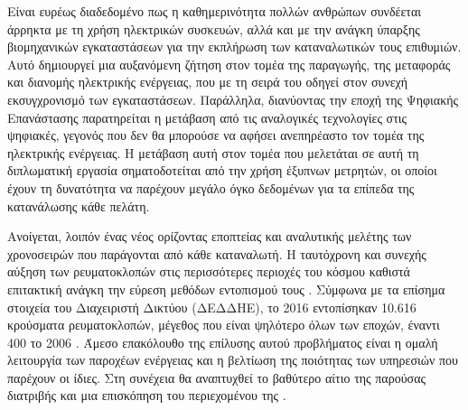 Είναι ευρέως διαδεδομένο πως η καθημερινότητα πολλών ανθρώπων συνδέεται άρρηκτα με τη χρήση ηλεκτρικών συσκευών, αλλά και με την ανάγκη ύπαρξης βιομηχανικών εγκαταστάσεων για την εκπλήρωση των καταναλωτικών τους επιθυμιών. Αυτό δημιουργεί μια αυξανόμενη ζήτηση στον τομέα της παραγωγής, της μεταφοράς και διανομής ηλεκτρικής ενέργειας, που με τη σειρά του οδηγεί στον συνεχή εκσυγχρονισμό των εγκαταστάσεων. Παράλληλα, διανύοντας την εποχή της Ψηφιακής Επανάστασης παρατηρείται η μετάβαση από τις αναλογικές τεχνολογίες στις ψηφιακές, γεγονός που δεν θα μπορούσε να αφήσει ανεπηρέαστο τον τομέα της ηλεκτρικής ενέργειας. Η μετάβαση αυτή στον τομέα που μελετάται σε αυτή τη διπλωματική εργασία σηματοδοτείται από την χρήση έξυπνων μετρητών, οι οποίοι έχουν τη δυνατότητα να παρέχουν μεγάλο όγκο δεδομένων για τα επίπεδα της κατανάλωσης κάθε πελάτη.\par
Ανοίγεται, λοιπόν ένας νέος ορίζοντας εποπτείας και αναλυτικής μελέτης των χρονοσειρών που παράγονται από κάθε καταναλωτή. Η ταυτόχρονη και συνεχής αύξηση των ρευματοκλοπών στις περισσότερες περιοχές του κόσμου καθιστά επιτακτική ανάγκη την εύρεση μεθόδων εντοπισμού τους . Σύμφωνα με τα επίσημα στοιχεία του Διαχειριστή Δικτύου (ΔΕΔΔΗΕ), το 2016 εντοπίσηκαν 10.616 κρούσματα ρευματοκλοπών, μέγεθος που είναι ψηλότερο όλων των εποχών, έναντι 400 το 2006 \cite{energypress}. Άμεσο επακόλουθο της επίλυσης αυτού προβλήματος είναι η ομαλή λειτουργία των παροχέων ενέργειας και η βελτίωση της ποιότητας των υπηρεσιών που παρέχουν οι ίδιες. Στη συνέχεια θα αναπτυχθεί το βαθύτερο αίτιο της παρούσας διατριβής και μια επισκόπηση του περιεχομένου της \cite{theftanalysis}.
